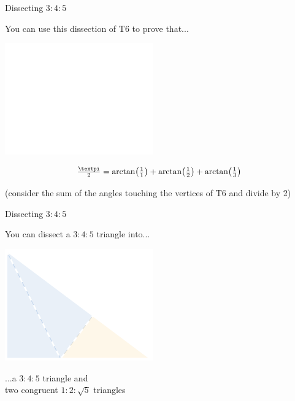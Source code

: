 \documentclass[14pt]{beamer}
\begin{document}
    \begin{frame}{Dissecting $3\!\!:\!\!4\!\!:\!\!5$}
        \begin{center}
            You can use this dissection of T6 to prove that...

            \bigskip\bigskip

            \includegraphics[height=18ex]{figures/figure006c.pdf}\vspace{-1em}

            $$\tfrac{\text{\textpi}}{2} = \arctan{\!\left(\tfrac{1}{1}\right)} + \arctan{\!\left(\tfrac{1}{2}\right)} + \arctan{\!\left(\tfrac{1}{3}\right)}$$

            {\footnotesize(consider the sum of the angles touching the vertices of T6 and divide by 2)}
        \end{center}
    \end{frame}


    \begin{frame}{Dissecting $3\!\!:\!\!4\!\!:\!\!5$}
        \begin{center}
            You can dissect a $3\!\!:\!\!4\!\!:\!\!5$ triangle into...

            \bigskip \bigskip

            \includegraphics[height=18ex]{figures/figure006d.pdf}

            \bigskip \bigskip

            ...a $3\!\!:\!\!4\!\!:\!\!5$ triangle and\\two congruent $1\!\!:\!\!2\!\!:\!\!\sqrt{5}$ triangles
        \end{center}
    \end{frame}
\end{document}
